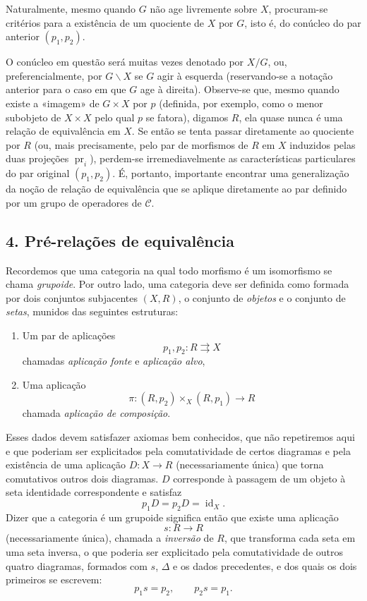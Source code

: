 \documentclass[11pt,twoside,openany]{book}
\numberwithin{equation}{section}
\newcommand{\src}[1]{%
  \phantomsection\hypertarget{src:#1}{}%
  \marginpar{\raggedleft\footnotesize\sffamily #1}%
}
\theoremstyle{plain}
\theoremstyle{definition}
\theoremstyle{remark}
\newcommand{\FgaUnitKey}{frontmatter}
\renewcommand{\src}[1]{%
  \phantomsection\hypertarget{src:\FgaUnitKey:#1}{}%
  \marginpar{\raggedleft\footnotesize\sffamily #1}%
}
\begin{document}
Naturalmente, mesmo quando $G$ não age livremente sobre $X$, procuram-se
critérios para a existência de um quociente de $X$ por $G$, isto é, do
conúcleo do par anterior $(p_1,p_2)$.

O conúcleo em questão será muitas vezes denotado por $X/G$, ou,
preferencialmente, por $G\backslash X$ se $G$ agir à esquerda (reservando-se a
notação anterior para o caso em que $G$ age à direita). Observe-se que, mesmo
quando existe a «imagem» de $G\times X$ por $p$ (definida, por exemplo, como o
menor subobjeto de $X\times X$ pelo qual $p$ se fatora), digamos $R$, ela quase
nunca é uma relação de equivalência em $X$. Se então se tenta passar
diretamente ao quociente por $R$ (ou, mais precisamente, pelo par de morfismos
de $R$ em $X$ induzidos pelas duas projeções $\operatorname{pr}_i$), perdem-se
irremediavelmente as características particulares do par original
$(p_1,p_2)$. É, portanto, importante encontrar uma generalização da noção de
relação de equivalência que se aplique diretamente ao par definido por um
grupo de operadores de $\mathcal C$.

\subsection*{4. Pré-relações de equivalência}

Recordemos que uma categoria na qual todo morfismo é um isomorfismo se chama
\emph{grupoide}. Por outro lado, uma categoria deve ser definida como formada
por dois conjuntos subjacentes $(X,R)$, o conjunto de \emph{objetos} e o
conjunto de \emph{setas}, munidos das seguintes estruturas:
\src{106}
\begin{enumerate}
\item[(i)] Um par de aplicações
\[
  p_1,p_2:R\rightrightarrows X
\]
chamadas \emph{aplicação fonte} e \emph{aplicação alvo},

\item[(ii)] Uma aplicação
\[
  \pi:(R,p_2)\times_X(R,p_1)\longrightarrow R
\]
chamada \emph{aplicação de composição}.
\end{enumerate}
Esses dados devem satisfazer axiomas bem conhecidos, que não repetiremos aqui
e que poderiam ser explicitados pela comutatividade de certos diagramas e pela
existência de uma aplicação $D:X\to R$ (necessariamente única) que torna
comutativos outros dois diagramas. $D$ corresponde à passagem de um objeto à
seta identidade correspondente e satisfaz
\[
  p_1D=p_2D=\operatorname{id}_X.
\]
Dizer que a categoria é um grupoide significa então que existe uma aplicação
\[
  s:R\longrightarrow R
\]
(necessariamente única), chamada a \emph{inversão} de $R$, que transforma cada
seta em uma seta inversa, o que poderia ser explicitado pela comutatividade de
outros quatro diagramas, formados com $s$, $\Delta$ e os dados precedentes, e
dos quais os dois primeiros se escrevem:
\[
  p_1s=p_2,\qquad p_2s=p_1.
\]
\end{document}
